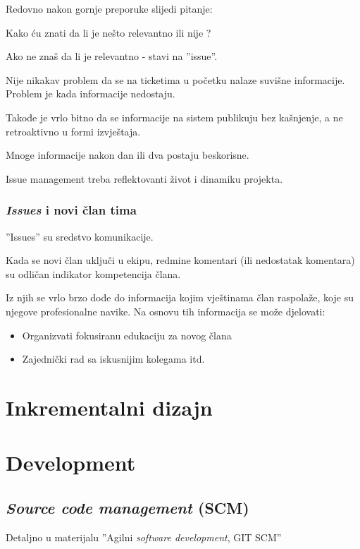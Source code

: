 \documentclass[lmodern, utf8, zavrsni]{fit}
\begin{document}
Redovno nakon gornje preporuke slijedi pitanje:

Kako ću znati da li je nešto relevantno  ili nije ?

Ako ne znaš da li je relevantno - stavi na ''issue''. 

Nije nikakav problem da se na ticketima u početku nalaze suvišne informacije. Problem je kada informacije nedostaju.

Takođe je vrlo bitno da se informacije na sistem publikuju bez kašnjenje, a ne retroaktivno u formi izvještaja.

Mnoge informacije nakon dan ili dva postaju beskorisne.

Issue management treba reflektovanti život i dinamiku projekta.

\subsection{\emph{Issues} i novi član tima}

''Issues'' su sredstvo komunikacije.

Kada se novi član uključi u ekipu, redmine komentari (ili nedostatak komentara) su odličan indikator kompetencija člana.

Iz njih se vrlo brzo dođe do informacija kojim vještinama član raspolaže, koje su njegove profesionalne navike. Na osnovu tih informacija se može djelovati: 
\begin{itemize}
  \item Organizvati fokusiranu edukaciju za novog člana
  \item Zajednički rad sa iskusnijim kolegama itd.
\end{itemize}

\chapter{Inkrementalni dizajn}

\chapter{Development}

\section{\emph{Source code management} (SCM)}

Detaljno u materijalu ''Agilni \emph{software development}, GIT SCM''\citep{agilegit}
\end{document}
